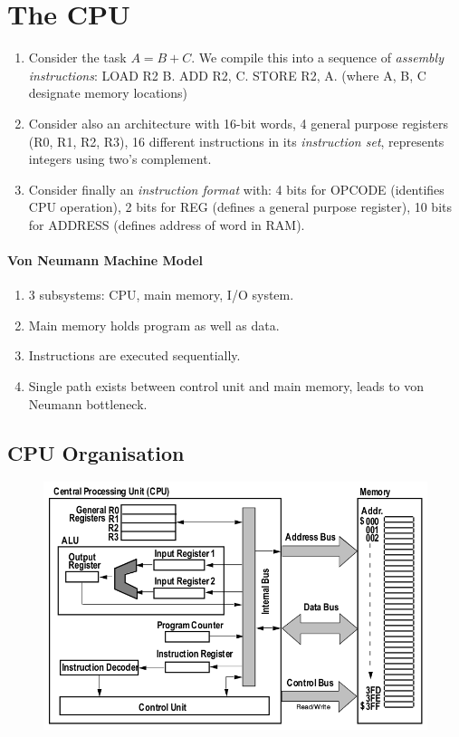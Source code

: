 \documentclass[twocolumn,english]{article}
\begin{document}
\section{The CPU}
\begin{enumerate}
\item Consider the task $A=B+C$. We compile this into a sequence of \emph{assembly
instructions}: LOAD R2 B. ADD R2, C. STORE R2, A. (where A, B, C designate
memory locations)
\item Consider also an architecture with 16-bit words, 4 general purpose
registers (R0, R1, R2, R3), 16 different instructions in its \emph{instruction
set}, represents integers using two's complement.
\item Consider finally an \emph{instruction format} with: 4 bits for OPCODE
(identifies CPU operation), 2 bits for REG (defines a general purpose
register), 10 bits for ADDRESS (defines address of word in RAM).
\end{enumerate}

\paragraph{Von Neumann Machine Model}
\begin{enumerate}
\item 3 subsystems: CPU, main memory, I/O system.
\item Main memory holds program as well as data.
\item Instructions are executed sequentially.
\item Single path exists between control unit and main memory, leads to
von Neumann bottleneck.
\end{enumerate}

\subsection{CPU Organisation}

\begin{figure}[H]
\noindent \centering{}\includegraphics[scale=0.35]{img/cpu}
\end{figure}
\end{document}
